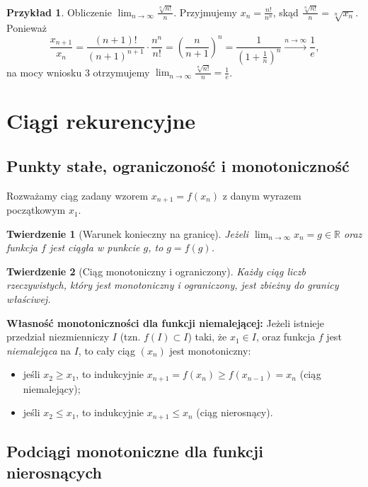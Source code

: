 \documentclass[11pt, a4paper]{article}
\theoremstyle{plain}
\newtheorem*{twierdzenie}{Twierdzenie}
\theoremstyle{definition}
\newtheorem*{przyklad}{Przykład}
\begin{document}
\begin{przyklad}
Obliczenie $\lim_{n\to\infty} \frac{\sqrt[n]{n!}}{n}$. Przyjmujemy $x_n = \frac{n!}{n^n}$, skąd $\frac{\sqrt[n]{n!}}{n} = \sqrt[n]{x_n}$. Ponieważ
\[
\frac{x_{n+1}}{x_n} = \frac{(n+1)!}{(n+1)^{n+1}} \cdot \frac{n^n}{n!} = \left(\frac{n}{n+1}\right)^n = \frac{1}{\left(1 + \frac{1}{n}\right)^n} \xrightarrow{n\to\infty} \frac{1}{e},
\]
na mocy wniosku 3 otrzymujemy $\lim_{n\to\infty} \frac{\sqrt[n]{n!}}{n} = \frac{1}{e}$.
\end{przyklad}

\section{Ciągi rekurencyjne}

\subsection{Punkty stałe, ograniczoność i monotoniczność}

Rozważamy ciąg zadany wzorem $x_{n+1} = f(x_n)$ z danym wyrazem początkowym $x_1$.

\begin{twierdzenie}[Warunek konieczny na granicę]
Jeżeli $\lim_{n\to\infty} x_n = g \in \mathbb{R}$ oraz funkcja $f$ jest ciągła w punkcie $g$, to $g = f(g)$.
\end{twierdzenie}

\begin{twierdzenie}[Ciąg monotoniczny i ograniczony]
Każdy ciąg liczb rzeczywistych, który jest monotoniczny i ograniczony, jest zbieżny do granicy właściwej.
\end{twierdzenie}

\noindent\textbf{Własność monotoniczności dla funkcji niemalejącej:}
Jeżeli istnieje przedział niezmienniczy $I$ (tzn. $f(I) \subset I$) taki, że $x_1 \in I$, oraz funkcja $f$ jest \emph{niemalejąca} na $I$, to cały ciąg $(x_n)$ jest monotoniczny:
\begin{itemize}
    \item jeśli $x_2 \geqslant x_1$, to indukcyjnie $x_{n+1} = f(x_n) \geqslant f(x_{n-1}) = x_n$ (ciąg niemalejący);
    \item jeśli $x_2 \leqslant x_1$, to indukcyjnie $x_{n+1} \leqslant x_n$ (ciąg nierosnący).
\end{itemize}

\subsection{Podciągi monotoniczne dla funkcji nierosnących}
\end{document}
